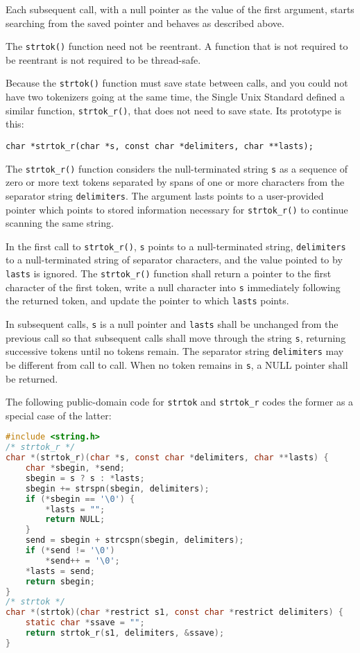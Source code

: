 Each subsequent call, with a null pointer as the value of the first argument,
starts searching from the saved pointer and behaves as described above.

The \texttt{strtok()} function need not be reentrant. A function that is not
required to be reentrant is not required to be thread-safe.

Because the \texttt{strtok()} function must save state between calls, and you
could not have two tokenizers going at the same time, the Single Unix Standard
defined a similar function, \texttt{strtok\_r()}, that does not need to save
state. Its prototype is this:

\texttt{char *strtok\_r(char *s, const char *delimiters, char **lasts);}

The \texttt{strtok\_r()} function considers the null-terminated string
\texttt{s} as a sequence of zero or more text tokens separated by spans of one
or more characters from the separator string \texttt{delimiters}. The argument
lasts points to a user-provided pointer which points to stored information
necessary for \texttt{strtok\_r()} to continue scanning the same string.

In the first call to \texttt{strtok\_r()}, \texttt{s} points to a
null-terminated string, \texttt{delimiters} to a null-terminated string of
separator characters, and the value pointed to by \texttt{lasts} is ignored.
The \texttt{strtok\_r()} function shall return a pointer to the first character
of the first token, write a null character into \texttt{s} immediately
following the returned token, and update the pointer to which \texttt{lasts}
points.

In subsequent calls, \texttt{s} is a null pointer and \texttt{lasts} shall be
unchanged from the previous call so that subsequent calls shall move through
the string \texttt{s}, returning successive tokens until no tokens remain. The
separator string \texttt{delimiters} may be different from call to call. When
no token remains in \texttt{s}, a NULL pointer shall be returned.

The following public-domain code for \texttt{strtok} and \texttt{strtok\_r}
codes the former as a special case of the latter:
\lstset{basicstyle=\scriptsize, numbers=left, captionpos=b, tabsize=4}
\begin{lstlisting}[caption=Section \thesection listing \arabic{stringcnt},language={C},
breaklines=true,xleftmargin=15pt,label=lst:section\thesection listing\arabic{stringcnt}]
#include <string.h>
/* strtok_r */
char *(strtok_r)(char *s, const char *delimiters, char **lasts) {
	char *sbegin, *send;
	sbegin = s ? s : *lasts;
	sbegin += strspn(sbegin, delimiters);
	if (*sbegin == '\0') {
		*lasts = "";
		return NULL;
	}
	send = sbegin + strcspn(sbegin, delimiters);
	if (*send != '\0')
		*send++ = '\0';
	*lasts = send;
	return sbegin;
}
/* strtok */
char *(strtok)(char *restrict s1, const char *restrict delimiters) {
	static char *ssave = "";
	return strtok_r(s1, delimiters, &ssave);
}
\end{lstlisting}

